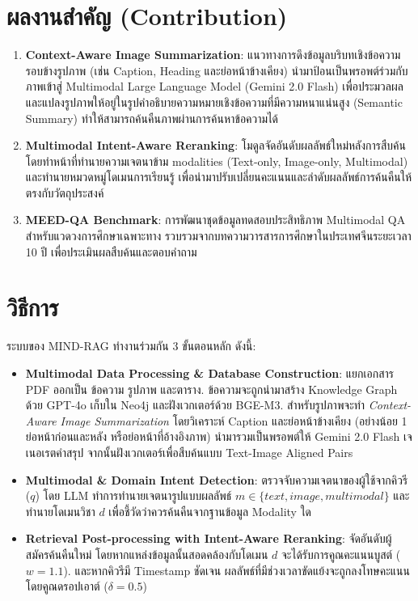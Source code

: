 \documentclass[10pt,a4paper]{article}
\begin{document}
\section*{ผลงานสำคัญ (Contribution)}

\begin{enumerate}[nosep, leftmargin=2em]
  \item \textbf{Context-Aware Image Summarization}: แนวทางการดึงข้อมูลบริบทเชิงข้อความรอบข้างรูปภาพ (เช่น Caption, Heading และย่อหน้าข้างเคียง) นำมาป้อนเป็นพรอพต์ร่วมกับภาพเข้าสู่ Multimodal Large Language Model (Gemini 2.0 Flash) เพื่อประมวลผลและแปลงรูปภาพให้อยู่ในรูปคำอธิบายความหมายเชิงข้อความที่มีความหนาแน่นสูง (Semantic Summary) ทำให้สามารถค้นคืนภาพผ่านการค้นหาข้อความได้
  \item \textbf{Multimodal Intent-Aware Reranking}: โมดูลจัดอันดับผลลัพธ์ใหม่หลังการสืบค้น โดยทำหน้าที่ทำนายความเจตนาข้าม modalities (Text-only, Image-only, Multimodal) และทำนายหมวดหมู่โดเมนการเรียนรู้ เพื่อนำมาปรับเปลี่ยนคะแนนและลำดับผลลัพธ์การค้นคืนให้ตรงกับวัตถุประสงค์
  \item \textbf{MEED-QA Benchmark}: การพัฒนาชุดข้อมูลทดสอบประสิทธิภาพ Multimodal QA สำหรับแวดวงการศึกษาเฉพาะทาง รวบรวมจากบทความวารสารการศึกษาในประเทศจีนระยะเวลา 10 ปี เพื่อประเมินผลสืบค้นและตอบคำถาม
\end{enumerate}

\section*{วิธีการ}

ระบบของ MIND-RAG ทำงานร่วมกัน 3 ขั้นตอนหลัก ดังนี้:
\begin{itemize}
  \item \textbf{Multimodal Data Processing \& Database Construction}: แยกเอกสาร PDF ออกเป็น ข้อความ รูปภาพ และตาราง. ข้อความจะถูกนำมาสร้าง Knowledge Graph ด้วย GPT-4o เก็บใน Neo4j และฝังเวกเตอร์ด้วย BGE-M3. สำหรับรูปภาพจะทำ \textit{Context-Aware Image Summarization} โดยวิเคราะห์ Caption และย่อหน้าข้างเคียง (อย่างน้อย 1 ย่อหน้าก่อนและหลัง หรือย่อหน้าที่อ้างอิงภาพ) นำมารวมเป็นพรอพต์ให้ Gemini 2.0 Flash เจเนอเรตคำสรุป จากนั้นฝังเวกเตอร์เพื่อสืบค้นแบบ Text-Image Aligned Pairs
  \item \textbf{Multimodal \& Domain Intent Detection}: ตรวจจับความเจตนาของผู้ใช้จากคิวรี ($q$) โดย LLM ทำการทำนายเจตนารูปแบบผลลัพธ์ $m \in \{text, image, multimodal\}$ และทำนายโดเมนวิชา $d$ เพื่อชี้วัดว่าควรค้นคืนจากฐานข้อมูล Modality ใด
  \item \textbf{Retrieval Post-processing with Intent-Aware Reranking}: จัดอันดับผู้สมัครค้นคืนใหม่ โดยหากแหล่งข้อมูลนั้นสอดคล้องกับโดเมน $d$ จะได้รับการคูณคะแนนบูสต์ ($w = 1.1$). และหากคิวรีมี Timestamp ชัดเจน ผลลัพธ์ที่มีช่วงเวลาขัดแย้งจะถูกลงโทษคะแนนโดยคูณดรอปเอาต์ ($\delta = 0.5$)
\end{itemize}
\end{document}
